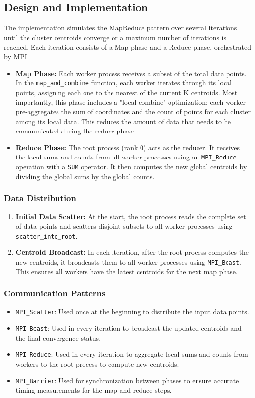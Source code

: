 \documentclass{article}
\begin{document}
\subsection{Design and Implementation}
The implementation simulates the MapReduce pattern over several iterations until the cluster centroids converge or a maximum number of iterations is reached. Each iteration consists of a Map phase and a Reduce phase, orchestrated by MPI.
\begin{itemize}
    \item \textbf{Map Phase:} Each worker process receives a subset of the total data points. In the \texttt{map\_and\_combine} function, each worker iterates through its local points, assigning each one to the nearest of the current K centroids. Most importantly, this phase includes a "local combine" optimization: each worker pre-aggregates the sum of coordinates and the count of points for each cluster among its local data. This reduces the amount of data that needs to be communicated during the reduce phase.
    \item \textbf{Reduce Phase:} The root process (rank 0) acts as the reducer. It receives the local sums and counts from all worker processes using an \texttt{MPI\_Reduce} operation with a \texttt{SUM} operator. It then computes the new global centroids by dividing the global sums by the global counts.
\end{itemize}

\subsubsection{Data Distribution}
\begin{enumerate}
    \item \textbf{Initial Data Scatter:} At the start, the root process reads the complete set of data points and scatters disjoint subsets to all worker processes using \texttt{scatter\_into\_root}.
    \item \textbf{Centroid Broadcast:} In each iteration, after the root process computes the new centroids, it broadcasts them to all worker processes using \texttt{MPI\_Bcast}. This ensures all workers have the latest centroids for the next map phase.
\end{enumerate}

\subsubsection{Communication Patterns}
\begin{itemize}
    \item \texttt{MPI\_Scatter}: Used once at the beginning to distribute the input data points.
    \item \texttt{MPI\_Bcast}: Used in every iteration to broadcast the updated centroids and the final convergence status.
    \item \texttt{MPI\_Reduce}: Used in every iteration to aggregate local sums and counts from workers to the root process to compute new centroids.
    \item \texttt{MPI\_Barrier}: Used for synchronization between phases to ensure accurate timing measurements for the map and reduce steps.
\end{itemize}
\end{document}
